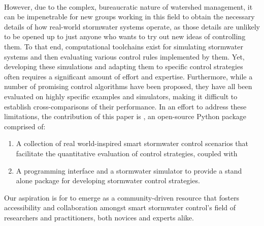\

However, due to the complex, bureaucratic nature of watershed management, it can be impenetrable for new groups working in this field to obtain the necessary details of how real-world stormwater systems operate, as those details are unlikely to be opened up to just anyone who wants to try out new ideas of controlling them. To that end, computational toolchains exist for simulating stormwater systems and then evaluating various control rules implemented by them. Yet, developing these simulations and adapting them to specific control strategies often requires a significant amount of effort and expertise.  Furthermore, while a number of promising control algorithms have been proposed, they have all been evaluated on highly specific examples and simulators, making it difficult to establish cross-comparisons of their performance. In an effort to address these limitations, the contribution of this paper is \pystormsNOSPACE, an open-source Python package comprised of:
%
\begin{enumerate}
\item A collection of real world-inspired smart stormwater control scenarios that facilitate the quantitative evaluation of control strategies, coupled with
\item A programming interface and a stormwater simulator to provide a stand alone package for developing stormwater control strategies.
\end{enumerate}
%
Our aspiration is for \pystorms to emerge as a community-driven resource that fosters accessibility and collaboration amongst smart stormwater control's field of researchers and practitioners, both novices and experts alike. 
%
%
%
%
%
%
%
%
%
%
%
%
%
%
%
